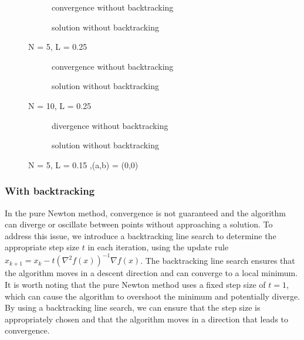 \documentclass[10pt,a4paper,notitlepage,twocolumn]{article}
\begin{document}
\begin{figure}[htbp]
    \centering
    \begin{subfigure}[b]{0.4\textwidth}
    
    \caption{convergence without backtracking}
    \label{fig:my_label}
    \end{subfigure}
    \hfill
    \begin{subfigure}[b]{0.4\textwidth}  
    
    \caption{solution without backtracking}
    \label{fig:my_label}
    \end{subfigure}
    \caption{N = 5, L = 0.25}
    \label{NoBTN5L0.25}
\end{figure}

\begin{figure}[htbp]
    \centering
    \begin{subfigure}[b]{0.4\textwidth}
    
    \caption{convergence without backtracking}
    \end{subfigure}
    \hfill
    \begin{subfigure}[b]{0.4\textwidth}  
    
    \caption{solution without backtracking}
    \end{subfigure}
    \caption{N = 10, L = 0.25}
    \label{NoBTN10L0.25}
\end{figure}

\begin{figure}[htbp]
    \centering
    \begin{subfigure}[b]{0.4\textwidth}
    
    \caption{divergence without backtracking}
    \end{subfigure}
    \hfill
    \begin{subfigure}[b]{0.4\textwidth}  
    
    \caption{solution without backtracking}
    \end{subfigure}
    \caption{N = 5, L = 0.15 ,(a,b) = (0,0)}
    \label{NoBTN5L0.15}
\end{figure}

\subsubsection{With backtracking}

In the pure Newton method, convergence is not guaranteed and the algorithm can diverge or oscillate between points without approaching a solution. To address this issue, we introduce a backtracking line search to determine the appropriate step size $t$ in each iteration, using the update rule $x_{k+1} = x_k - t(\nabla^2 f(x))^{-1}\nabla f(x)$. The backtracking line search ensures that the algorithm moves in a descent direction and can converge to a local minimum. It is worth noting that the pure Newton method uses a fixed step size of $t=1$, which can cause the algorithm to overshoot the minimum and potentially diverge. By using a backtracking line search, we can ensure that the step size is appropriately chosen and that the algorithm moves in a direction that leads to convergence.
\end{document}
